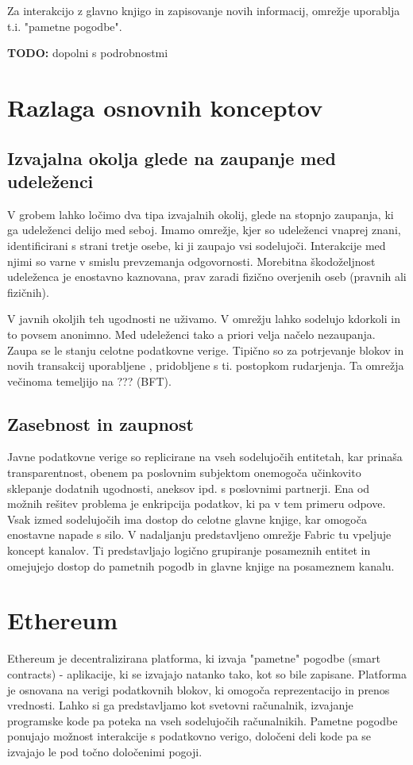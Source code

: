 \documentclass[a4paper, 12pt]{book}
\begin{document}
Za interakcijo z glavno knjigo in zapisovanje novih informacij, omrežje uporablja t.i. "pametne pogodbe". \cite{hyperledgerDocs}

\textbf{TODO:} dopolni s podrobnostmi

\section{Razlaga osnovnih konceptov}

\subsection{Izvajalna okolja glede na zaupanje med udeleženci}
V grobem lahko ločimo dva tipa izvajalnih okolij, glede na stopnjo zaupanja, ki ga udeleženci delijo med seboj.
Imamo omrežje, kjer so udeleženci vnaprej znani, identificirani s strani tretje osebe, ki ji zaupajo vsi sodelujoči.
Interakcije med njimi so varne v smislu prevzemanja odgovornosti.
Morebitna škodoželjnost udeleženca je enostavno kaznovana, prav zaradi fizično overjenih oseb (pravnih ali fizičnih).

V javnih okoljih teh ugodnosti ne uživamo.
V omrežju lahko sodelujo kdorkoli in to povsem anonimno.
Med udeleženci tako a priori velja načelo nezaupanja.
Zaupa se le stanju celotne podatkovne verige.
Tipično so za potrjevanje blokov in novih transakcij uporabljene , pridobljene s ti. postopkom rudarjenja.
Ta omrežja večinoma temeljijo na ??? (BFT). \cite{hyperledgerDocs}

\subsection{Zasebnost in zaupnost}
Javne podatkovne verige so replicirane na vseh sodelujočih entitetah, kar prinaša transparentnost, obenem pa poslovnim subjektom onemogoča učinkovito sklepanje dodatnih ugodnosti, aneksov ipd. s poslovnimi partnerji.
Ena od možnih rešitev problema je enkripcija podatkov, ki pa v tem primeru odpove.
Vsak izmed sodelujočih ima dostop do celotne glavne knjige, kar omogoča enostavne napade s silo.
V nadaljanju predstavljeno omrežje Fabric tu vpeljuje koncept kanalov.
Ti predstavljajo logično grupiranje posameznih entitet in omejujejo dostop do pametnih pogodb in glavne knjige na posameznem kanalu. \cite{hyperledgerDocs}

\section{Ethereum}
Ethereum je decentralizirana platforma, ki izvaja "pametne" pogodbe (smart contracts) - aplikacije, ki se izvajajo natanko tako, kot so bile zapisane.
Platforma je osnovana na verigi podatkovnih blokov, ki omogoča reprezentacijo in prenos vrednosti.
Lahko si ga predstavljamo kot svetovni računalnik, izvajanje programske kode pa poteka na vseh sodelujočih računalnikih.
Pametne pogodbe ponujajo možnost interakcije s podatkovno verigo, določeni deli kode pa se izvajajo le pod točno določenimi pogoji.
\end{document}
